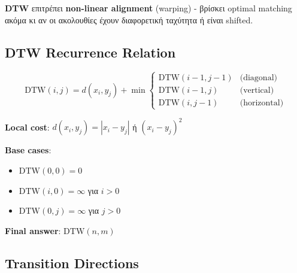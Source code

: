 \begin{infobox}
\textbf{DTW} επιτρέπει \textbf{non-linear alignment} (warping) - βρίσκει optimal matching ακόμα κι αν οι ακολουθίες έχουν διαφορετική ταχύτητα ή είναι shifted.
\end{infobox}

\subsection{DTW Recurrence Relation}

\begin{formulabox}
\begin{equation}
\text{DTW}(i, j) = d(x_i, y_j) + \min \begin{cases}
\text{DTW}(i-1, j-1) & \text{(diagonal)}\\
\text{DTW}(i-1, j) & \text{(vertical)}\\
\text{DTW}(i, j-1) & \text{(horizontal)}
\end{cases}
\end{equation}

\textbf{Local cost}: $d(x_i, y_j) = |x_i - y_j|$ ή $(x_i - y_j)^2$

\textbf{Base cases}:
\begin{itemize}
    \item $\text{DTW}(0, 0) = 0$
    \item $\text{DTW}(i, 0) = \infty$ για $i > 0$
    \item $\text{DTW}(0, j) = \infty$ για $j > 0$
\end{itemize}

\textbf{Final answer}: $\text{DTW}(n, m)$
\end{formulabox}

\subsection{Transition Directions}


